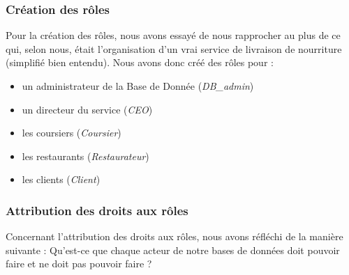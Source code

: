 \documentclass[french]{article}
\begin{document}
            \subsubsection*{Création des rôles}
                Pour la création des rôles, nous avons essayé de nous rapprocher au plus de ce qui, selon nous, était l'organisation d'un vrai service de livraison de nourriture (simplifié bien entendu).
                Nous avons donc créé des rôles pour : 
                \begin{itemize}
                    \item un administrateur de la Base de Donnée (\textit{DB\_admin})
                    \item un directeur du service (\textit{CEO})
                    \item les coursiers (\textit{Coursier})
                    \item les restaurants (\textit{Restaurateur})
                    \item les clients (\textit{Client})
                \end{itemize}
            
            \subsubsection*{Attribution des droits aux rôles}
                Concernant l'attribution des droits aux rôles, nous avons réfléchi de la manière suivante : Qu'est-ce que chaque acteur de notre bases de données doit pouvoir faire et ne doit pas pouvoir faire ?
\end{document}
